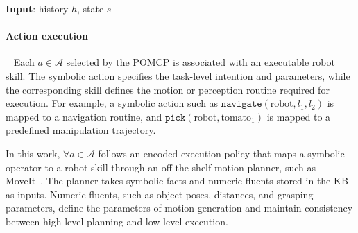 \begin{algorithm}[t]
\caption{Action Selection and Rollout}
\label{alg:selection}
\textbf{Input}: history $h$, state $s$
\BlankLine

    
\BlankLine


\end{algorithm}

\paragraph{Action execution}~\label{method:action_execution}
Each $a \in \mathcal{A}$ selected by the POMCP is associated with an executable robot skill. The symbolic action specifies the task-level intention and parameters, while the corresponding skill defines the motion or perception routine required for execution. For example, a symbolic action such as $\texttt{navigate}(\text{robot}, l_1, l_2)$ is mapped to a navigation routine, and $\texttt{pick}(\text{robot}, \text{tomato}_1)$ is mapped to a predefined manipulation trajectory.

In this work, $\forall a \in \mathcal{A}$ follows an encoded execution policy that maps a symbolic operator to a robot skill through an off-the-shelf motion planner, such as MoveIt~\cite{chitta2012moveit}. The planner takes symbolic facts and numeric fluents stored in the KB as inputs. Numeric fluents, such as object poses, distances, and grasping parameters, define the parameters of motion generation and maintain consistency between high-level planning and low-level execution.

